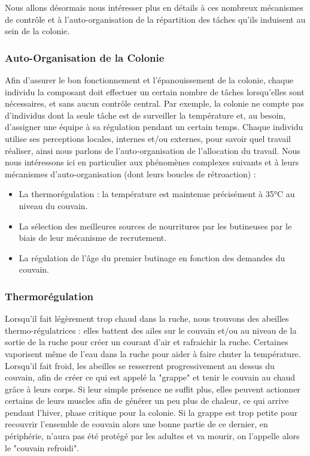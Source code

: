 			Nous allons désormais nous intéresser plus en détails à ces nombreux mécanismes de contrôle et à l'auto-organisation de la répartition des tâches qu'ils induisent au sein de la colonie.
			
		\subsubsection{Auto-Organisation de la Colonie}
			Afin d'assurer le bon fonctionnement et l'épanouissement de la colonie, chaque individu la composant doit effectuer un certain nombre de tâches lorsqu'elles sont nécessaires, et sans aucun contrôle central. Par exemple, la colonie ne compte pas d'individus dont la seule tâche est de surveiller la température et, au besoin, d'assigner une équipe à sa régulation pendant un certain temps. Chaque individu utilise ses perceptions locales, internes et/ou externes, pour savoir quel travail réaliser, ainsi nous parlons de l'auto-organisation de l'allocation du travail. Nous nous intéressons ici en particulier aux phénomènes complexes suivants et à leurs mécanismes d'auto-organisation (dont leurs boucles de rétroaction) :
			
			
			\begin{itemize}
				\item La thermorégulation : la température est maintenue précisément à 35°C au niveau du couvain.
				\item La sélection des meilleures sources de nourritures par les butineuses par le biais de leur mécanisme de recrutement.
				\item La régulation de l'âge du premier butinage en fonction des demandes du couvain.
			\end{itemize}

			\subsubsection{Thermorégulation}	
			
			Lorsqu'il fait légèrement trop chaud dans la ruche, nous trouvons des abeilles thermo-régulatrices : elles battent des ailes sur le couvain et/ou au niveau de la sortie de la ruche pour créer un courant d'air et rafraichir la ruche. Certaines vaporisent même de l'eau dans la ruche pour aider à faire chuter la température. Lorsqu'il fait froid, les abeilles se resserrent progressivement au dessus du couvain, afin de créer ce qui est appelé la "grappe" et tenir le couvain au chaud grâce à leurs corps. Si leur simple présence ne suffit plus, elles peuvent actionner certains de leurs muscles afin de générer un peu plus de chaleur, ce qui arrive pendant l'hiver, phase critique pour la colonie. Si la grappe est trop petite pour recouvrir l'ensemble de couvain alors une bonne partie de ce dernier, en périphérie, n'aura pas été protégé par les adultes et va mourir, on l'appelle alors le "couvain refroidi".
					

